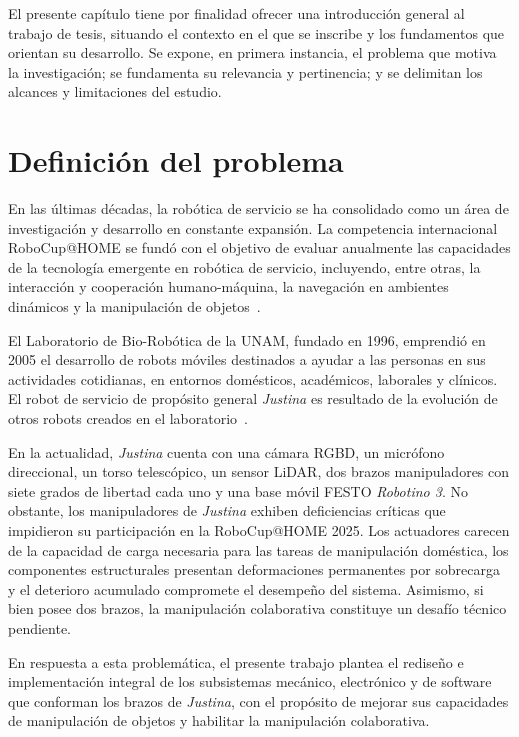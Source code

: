 El presente capítulo tiene por finalidad ofrecer una introducción general al trabajo de tesis, situando el contexto en el que se inscribe y los fundamentos que orientan su desarrollo. Se expone, en primera instancia, el problema que motiva la investigación; se fundamenta su relevancia y pertinencia; y se delimitan los alcances y limitaciones del estudio.

\section{Definición del problema}

En las últimas décadas, la robótica de servicio se ha consolidado como un área de investigación y desarrollo en constante expansión. La competencia internacional RoboCup@HOME se fundó con el objetivo de evaluar anualmente las capacidades de la tecnología emergente en robótica de servicio, incluyendo, entre otras, la interacción y cooperación humano-máquina, la navegación en ambientes dinámicos y la manipulación de objetos~\cite{robocup_athome}. 

El Laboratorio de Bio-Robótica de la UNAM, fundado en 1996, emprendió en 2005 el desarrollo de robots móviles destinados a ayudar a las personas en sus actividades cotidianas, en entornos domésticos, académicos, laborales y clínicos. El robot de servicio de propósito general \emph{Justina} es resultado de la evolución de otros robots creados en el laboratorio~\cite{justina_uv}.

En la actualidad, \emph{Justina} cuenta con una cámara RGBD, un micrófono direccional, un torso telescópico, un sensor LiDAR, dos brazos manipuladores con siete grados de libertad cada uno y una base móvil FESTO \emph{Robotino 3}. No obstante, los manipuladores de \emph{Justina} exhiben deficiencias críticas que impidieron su participación en la RoboCup@HOME 2025. Los actuadores carecen de la capacidad de carga necesaria para las tareas de manipulación doméstica, los componentes estructurales presentan deformaciones permanentes por sobrecarga y el deterioro acumulado compromete el desempeño del sistema. Asimismo, si bien posee dos brazos, la manipulación colaborativa constituye un desafío técnico pendiente.

En respuesta a esta problemática, el presente trabajo plantea el rediseño e implementación integral de los subsistemas mecánico, electrónico y de software que conforman los brazos de \emph{Justina}, con el propósito de mejorar sus capacidades de manipulación de objetos y habilitar la manipulación colaborativa.

